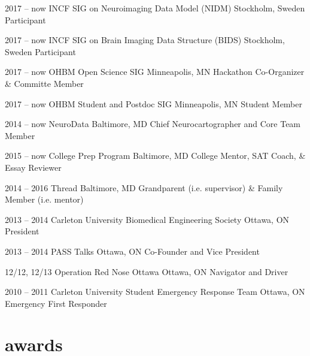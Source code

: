 \documentclass[]{friggeri-cv} %
\begin{document}
\begin{entrylist}
\entry
{2017 -- now}
{INCF SIG on Neuroimaging Data Model (NIDM)}
{Stockholm, Sweden}
{Participant}

\entry
{2017 -- now}
{INCF SIG on Brain Imaging Data Structure (BIDS)}
{Stockholm, Sweden}
{Participant}

\entry
{2017 -- now}
{OHBM Open Science SIG}
{Minneapolis, MN}
{Hackathon Co-Organizer \& Committe Member}
\end{entrylist}
\begin{entrylist}
\entry
{2017 -- now}
{OHBM Student and Postdoc SIG}
{Minneapolis, MN}
{Student Member}

\entry
{2014 -- now}
{NeuroData}
{Baltimore, MD}
{Chief Neurocartographer and Core Team Member}

\entry
{2015 -- now}
{College Prep Program}
{Baltimore, MD}
{College Mentor, SAT Coach, \& Essay Reviewer}

\entry
{2014 -- 2016}
{Thread}
{Baltimore, MD}
{Grandparent (i.e. supervisor) \& Family Member (i.e. mentor) }

\entry
{2013 -- 2014}
{Carleton University Biomedical Engineering Society}
{Ottawa, ON}
{President}

\entry
{2013 -- 2014}
{PASS Talks}
{Ottawa, ON}
{Co-Founder and Vice President}

\entry
{12/12, 12/13}
{Operation Red Nose Ottawa}
{Ottawa, ON}
{Navigator and Driver}

\entry
{2010 -- 2011}
{Carleton University Student Emergency Response Team}
{Ottawa, ON}
{Emergency First Responder}
\end{entrylist}


\section{awards}
\end{document}
